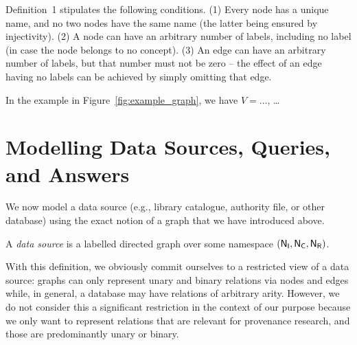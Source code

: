 %
Definition~1 stipulates the following conditions.
%
(1) Every node has a unique name, and no two nodes have the same name (the latter being ensured by injectivity).
(2) A node can have an arbitrary number of labels, including no label (in case the node belongs to no concept).
(3) An edge can have an arbitrary number of labels, but that number must not be zero --
the effect of an edge having no labels can be achieved by simply omitting that edge.

In the example in Figure~\ref{fig:example_graph},
we have $V = \dots$, \dots{}

\section{Modelling Data Sources, Queries, and Answers}

We now model a data source (e.g., library catalogue, authority file, or other database)
using the exact notion of a graph that we have introduced above.
%
\begin{definition}
  A \emph{data source} is a labelled directed graph
  over some namespace $(\mathsf{N}_\mathsf{I},\mathsf{N}_\mathsf{C},\mathsf{N}_\mathsf{R})$.
\end{definition}
%
With this definition, we obviously commit ourselves to a restricted view of a data source:
graphs can only represent unary and binary relations via nodes and edges
while, in general, a database may have relations of arbitrary arity.
However, we do not consider this a significant restriction in the context of our purpose
because we only want to represent relations that are relevant for provenance research,
and those are predominantly unary or binary. 

